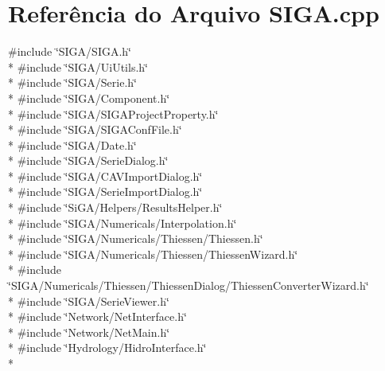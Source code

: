 \section{Referência do Arquivo S\+I\+G\+A.\+cpp}
\label{_s_i_g_a_8cpp}
{\ttfamily \#include \char`\"{}S\+I\+G\+A/\+S\+I\+G\+A.\+h\char`\"{}}\\*
{\ttfamily \#include \char`\"{}S\+I\+G\+A/\+Ui\+Utils.\+h\char`\"{}}\\*
{\ttfamily \#include \char`\"{}S\+I\+G\+A/\+Serie.\+h\char`\"{}}\\*
{\ttfamily \#include \char`\"{}S\+I\+G\+A/\+Component.\+h\char`\"{}}\\*
{\ttfamily \#include \char`\"{}S\+I\+G\+A/\+S\+I\+G\+A\+Project\+Property.\+h\char`\"{}}\\*
{\ttfamily \#include \char`\"{}S\+I\+G\+A/\+S\+I\+G\+A\+Conf\+File.\+h\char`\"{}}\\*
{\ttfamily \#include \char`\"{}S\+I\+G\+A/\+Date.\+h\char`\"{}}\\*
{\ttfamily \#include \char`\"{}S\+I\+G\+A/\+Serie\+Dialog.\+h\char`\"{}}\\*
{\ttfamily \#include \char`\"{}S\+I\+G\+A/\+C\+A\+V\+Import\+Dialog.\+h\char`\"{}}\\*
{\ttfamily \#include \char`\"{}S\+I\+G\+A/\+Serie\+Import\+Dialog.\+h\char`\"{}}\\*
{\ttfamily \#include \char`\"{}Si\+G\+A/\+Helpers/\+Results\+Helper.\+h\char`\"{}}\\*
{\ttfamily \#include \char`\"{}S\+I\+G\+A/\+Numericals/\+Interpolation.\+h\char`\"{}}\\*
{\ttfamily \#include \char`\"{}S\+I\+G\+A/\+Numericals/\+Thiessen/\+Thiessen.\+h\char`\"{}}\\*
{\ttfamily \#include \char`\"{}S\+I\+G\+A/\+Numericals/\+Thiessen/\+Thiessen\+Wizard.\+h\char`\"{}}\\*
{\ttfamily \#include \char`\"{}S\+I\+G\+A/\+Numericals/\+Thiessen/\+Thiessen\+Dialog/\+Thiessen\+Converter\+Wizard.\+h\char`\"{}}\\*
{\ttfamily \#include \char`\"{}S\+I\+G\+A/\+Serie\+Viewer.\+h\char`\"{}}\\*
{\ttfamily \#include \char`\"{}Network/\+Net\+Interface.\+h\char`\"{}}\\*
{\ttfamily \#include \char`\"{}Network/\+Net\+Main.\+h\char`\"{}}\\*
{\ttfamily \#include \char`\"{}Hydrology/\+Hidro\+Interface.\+h\char`\"{}}\\*
